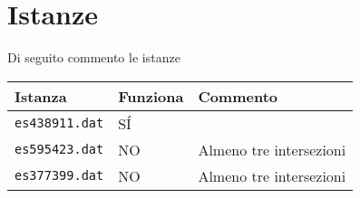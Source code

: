 \documentclass{scrartcl}
\begin{document}
\section{Istanze}
Di seguito commento le istanze
\begin{table}[h!]
\begin{tabular}{|l|l|l|}
	\hline
	\textbf{Istanza} & \textbf{Funziona} & \textbf{Commento} \\
	\hline
	\verb|es438911.dat| & SÍ & \\
	\hline
	\verb|es595423.dat| & NO & Almeno tre intersezioni \\
	\hline
	\verb|es377399.dat| & NO & Almeno tre intersezioni \\
	\hline
\end{tabular}
\end{table}
\end{document}
